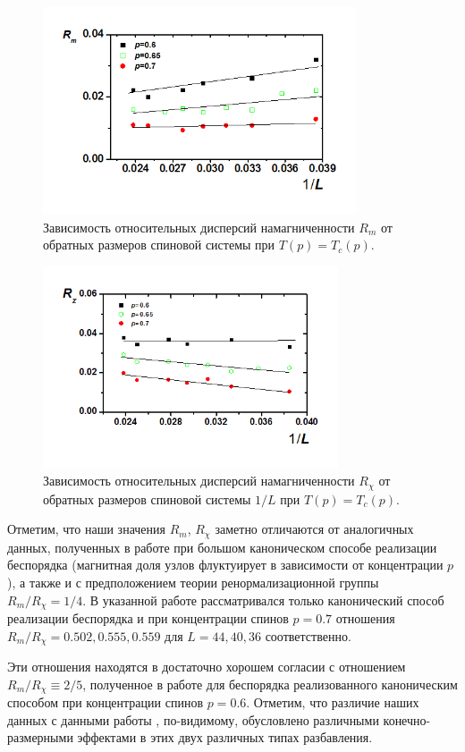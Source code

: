 \begin{figure}[H]
	\centering
	\includegraphics[width=0.5\linewidth]{content/sections/images/phys2-1}
	\caption{Зависимость относительных дисперсий намагниченности $R_m$ от обратных размеров спиновой системы при $T(p)=T_c(p)$.}
	\label{phys2-pic-1}
\end{figure}

\begin{figure}[H]
	\centering
	\includegraphics[width=0.5\linewidth]{content/sections/images/phys2-2}
	\caption{Зависимость относительных дисперсий намагниченности $R_{\chi}$ от обратных размеров спиновой системы $1/L$ при $T(p)=T_c(p)$.}
	\label{phys2-pic-2}
\end{figure}


Отметим, что наши значения $R_m$, $R_\chi$ заметно отличаются от аналогичных данных, полученных в работе \cite{ph2_4} при большом каноническом способе реализации беспорядка (магнитная доля узлов флуктуирует в зависимости от концентрации $p$), а также и с предположением теории ренормализационной группы  $R_m / R_\chi = 1/4$. В указанной работе рассматривался только канонический способ реализации беспорядка и при концентрации спинов $p=0.7$ отношения $R_m / R_\chi =0.502, 0.555, 0.559$ для $L=44, 40, 36$ соответственно.

Эти отношения находятся в достаточно хорошем согласии с отношением \linebreak $R_m / R_\chi \equiv 2/5$, полученное в работе \cite{ph2_1} для беспорядка реализованного каноническим способом при концентрации спинов $p=0.6$. Отметим, что различие наших данных с данными работы \cite{ph2_4}, по-видимому, обусловлено различными конечно-размерными эффектами в этих двух различных типах разбавления.


